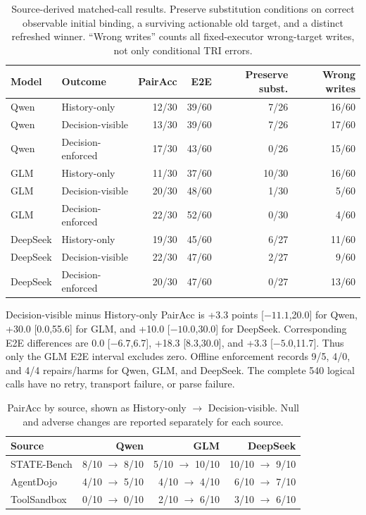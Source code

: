 \documentclass[10pt]{article}
\begin{document}
\begin{table}[H]
\centering
\small
\begin{tabular}{llrrrr}
\toprule
Model & Outcome & PairAcc & E2E & Preserve subst. & Wrong writes \\
\midrule
Qwen & History-only & 12/30 & 39/60 & 7/26 & 16/60 \\
Qwen & Decision-visible & 13/30 & 39/60 & 7/26 & 17/60 \\
Qwen & Decision-enforced & 17/30 & 43/60 & 0/26 & 15/60 \\
GLM & History-only & 11/30 & 37/60 & 10/30 & 16/60 \\
GLM & Decision-visible & 20/30 & 48/60 & 1/30 & 5/60 \\
GLM & Decision-enforced & 22/30 & 52/60 & 0/30 & 4/60 \\
DeepSeek & History-only & 19/30 & 45/60 & 6/27 & 11/60 \\
DeepSeek & Decision-visible & 22/30 & 47/60 & 2/27 & 9/60 \\
DeepSeek & Decision-enforced & 20/30 & 47/60 & 0/27 & 13/60 \\
\bottomrule
\end{tabular}
\caption{Source-derived matched-call results. Preserve substitution conditions on correct
observable initial binding, a surviving actionable old target, and a distinct refreshed winner.
``Wrong writes'' counts all fixed-executor wrong-target writes, not only conditional TRI errors.}
\label{tab:supp-source-matched}
\end{table}

Decision-visible minus History-only PairAcc is +3.3 points [$-11.1$,20.0] for Qwen, +30.0
[0.0,55.6] for GLM, and +10.0 [$-10.0$,30.0] for DeepSeek. Corresponding E2E differences are
0.0 [$-6.7$,6.7], +18.3 [8.3,30.0], and +3.3 [$-5.0$,11.7]. Thus only the GLM E2E interval
excludes zero. Offline enforcement records 9/5, 4/0, and 4/4 repairs/harms for Qwen, GLM, and
DeepSeek. The complete 540 logical calls have no retry, transport failure, or parse failure.

\begin{table}[H]
\centering
\small
\begin{tabular}{lrrr}
\toprule
Source & Qwen & GLM & DeepSeek \\
\midrule
STATE-Bench & 8/10 $\rightarrow$ 8/10 & 5/10 $\rightarrow$ 10/10 & 10/10 $\rightarrow$ 9/10 \\
AgentDojo & 4/10 $\rightarrow$ 5/10 & 4/10 $\rightarrow$ 4/10 & 6/10 $\rightarrow$ 7/10 \\
ToolSandbox & 0/10 $\rightarrow$ 0/10 & 2/10 $\rightarrow$ 6/10 & 3/10 $\rightarrow$ 6/10 \\
\bottomrule
\end{tabular}
\caption{PairAcc by source, shown as History-only $\rightarrow$ Decision-visible. Null and adverse
changes are reported separately for each source.}
\label{tab:supp-source-slices}
\end{table}
\end{document}
